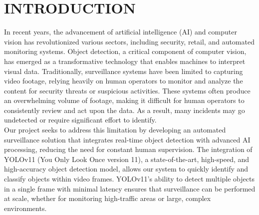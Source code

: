 \documentclass[12pt]{report}
\begin{document}

\newpage
\thispagestyle{empty}


\tableofcontents






\cleardoublepage       %
\setcounter{page}{1}

\newpage

\chapter{INTRODUCTION}
In recent years, the advancement of artificial intelligence (AI) and computer vision has revolutionized various sectors, including security, retail, and automated monitoring systems. Object detection, a critical component of computer vision, has emerged as a transformative technology that enables machines to interpret visual data. Traditionally, surveillance systems have been limited to capturing video footage, relying heavily on human operators to monitor and analyze the content for security threats or suspicious activities. These systems often produce an overwhelming volume of footage, making it difficult for human operators to consistently review and act upon the data. As a result, many incidents may go undetected or require significant effort to identify.\\

Our project seeks to address this limitation by developing an automated surveillance solution that integrates real-time object detection with advanced AI processing, reducing the need for constant human supervision. The integration of YOLOv11 (You Only Look Once version 11), a state-of-the-art, high-speed, and high-accuracy object detection model, allows our system to quickly identify and classify objects within video frames. YOLOv11's ability to detect multiple objects in a single frame with minimal latency ensures that surveillance can be performed at scale, whether for monitoring high-traffic areas or large, complex environments.\\
\end{document}
